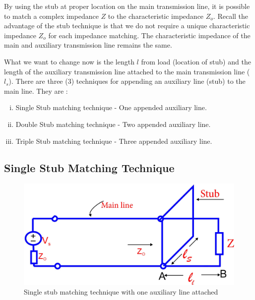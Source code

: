 By using the stub at proper location on the main transmission line, it is possible to match a complex impedance $Z$ to the characteristic impedance $Z_o$.
Recall the advantage of the stub technique is that we do not require a unique characteristic impedance $Z_o$ for each impedance matching. The characteristic impedance of the main and auxiliary transmission line remains the same.

What we want to change now is the length $l$ from load (location of stub) and the length of the auxiliary transmission line attached to the main transmission line ($l_s$). There are three (3) techniques for appending an auxiliary line (stub) to the main line. They are :
\begin{enumerate}[(i)]
\item Single Stub matching technique - One appended auxiliary line.
\item Double Stub matching technique - Two appended auxiliary line.
\item Triple Stub matching technique - Three appended auxiliary line.
\end{enumerate} 
\subsection{Single Stub Matching Technique }
\begin{figure}[h]
\centering
\includegraphics[width=1\linewidth]{./graphics/fig11}
\caption{Single stub matching technique with one auxiliary line attached}
\end{figure}

